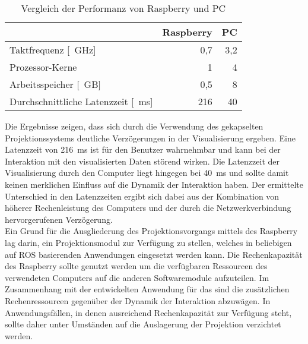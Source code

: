 
\begin{table}[ht]
\begin{center}
\setlength{\tabcolsep}{18pt}
\begin{tabular}{lrr}
\toprule
 & \multicolumn{1}{c}{Raspberry} & \multicolumn{1}{c}{PC}\\
\midrule
Taktfrequenz [\SI{}{\GHz}] & 0,7 & 3,2 \\ \addlinespace
Prozessor-Kerne & 1 & 4\\ \addlinespace
Arbeitsspeicher [\SI{}{GB}] & 0,5 & 8\\ \addlinespace
Durchschnittliche Latenzzeit [\SI{}{\milli\second}] & 216 & 40 \\
\bottomrule
\end{tabular}
\caption{Vergleich der Performanz von Raspberry und PC}
\label{tab.latency}
\end{center}
\end{table}


Die Ergebnisse zeigen, dass sich durch die Verwendung des gekapselten Projektionssystems deutliche Verzögerungen in der Visualisierung ergeben. Eine Latenzzeit von \SI{216}{\milli\second} ist für den Benutzer wahrnehmbar und kann bei der Interaktion mit den visualisierten Daten störend wirken. Die Latenzzeit der Visualisierung durch den Computer liegt hingegen bei \SI{40}{\milli\second} und sollte damit keinen merklichen Einfluss auf die Dynamik der Interaktion haben. Der ermittelte Unterschied in den Latenzzeiten ergibt sich dabei aus der Kombination von höherer Rechenleistung des Computers und der  durch die Netzwerkverbindung hervorgerufenen Verzögerung.\\

Ein Grund für die Ausgliederung des Projektionsvorgangs mittels des Raspberry lag darin, ein Projektionsmodul zur Verfügung zu stellen, welches in beliebigen auf ROS basierenden Anwendungen eingesetzt werden kann. Die Rechenkapazität des Raspberry sollte genutzt werden um die verfügbaren Ressourcen des verwendeten Computers auf die anderen Softwaremodule aufzuteilen. Im Zusammenhang mit der entwickelten Anwendung für das \kps{} sind die zusätzlichen Rechenressourcen gegenüber der Dynamik der Interaktion abzuwägen. In Anwendungsfällen, in denen ausreichend Rechenkapazität zur Verfügung steht, sollte daher unter Umständen auf die Auslagerung der Projektion verzichtet werden.